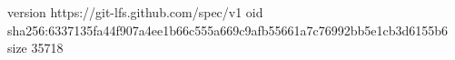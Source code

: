 version https://git-lfs.github.com/spec/v1
oid sha256:6337135fa44f907a4ee1b66c555a669c9afb55661a7c76992bb5e1cb3d6155b6
size 35718
